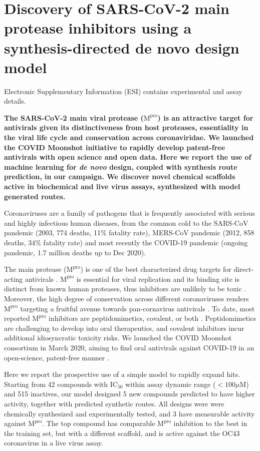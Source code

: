 \chapter{Discovery of SARS-CoV-2 main protease inhibitors using a synthesis-directed de novo design model}\label{ch:ranking}
Electronic Supplementary Information (ESI) contains experimental and assay details. 

\textbf{The SARS-CoV-2 main viral protease ($\mathrm{M}^\mathrm{pro}$) is an attractive target for antivirals given its distinctiveness from host proteases, essentiality in the viral life cycle and conservation across coronaviridae. We launched the COVID Moonshot initiative to rapidly develop patent-free antivirals with open science and open data. Here we report the use of machine learning for \emph{de novo} design, coupled with synthesis route prediction, in our campaign. We discover novel chemical scaffolds active in biochemical and live virus assays, synthesized with model generated routes. }

Coronaviruses are a family of pathogens that is frequently associated with serious and highly infectious human diseases, from the common cold to the SARS-CoV pandemic (2003, 774 deaths, 11\% fatality rate), MERS-CoV pandemic (2012, 858 deaths, 34\% fatality rate) and most recently the COVID-19 pandemic (ongoing pandemic, 1.7 million deaths up to Dec 2020).

The main protease ($\mathrm{M}^\mathrm{pro}$) is one of the best characterized drug targets for direct-acting antivirals \cite{pillaiyar2016overview,cannalire2020targeting}. $\mathrm{M}^\mathrm{pro}$ is essential for viral replication and its binding site is distinct from known human proteases, thus inhibitors are unlikely to be toxic \cite{jin2020structure,liu2020development}. Moreover, the high degree of conservation across different coronaviruses renders $\mathrm{M}^\mathrm{pro}$ targeting a fruitful avenue towards pan-cornavirus antivirals \cite{ullrich2020sars}. To date, most reported $\mathrm{M}^\mathrm{pro}$ inhibitors are peptidomimetics, covalent, or both \cite{cannalire2020targeting}. Peptidomimetics are challenging to develop into oral therapeutics, and covalent inhibitors incur additional idiosyncratic toxicity risks. We launched the COVID Moonshot consortium in March 2020, aiming to find oral antivirals against COVID-19 in an open-science, patent-free manner \cite{chodera2020crowdsourcing}. 

Here we report the prospective use of a simple model to rapidly expand hits. Starting from 42 compounds with $\mathrm{IC}_{50}$ within assay dynamic range ($<100 \mu$M) and 515 inactives, our model designed 5 new compounds predicted to have higher activity, together with predicted synthetic routes. All designs were were chemically synthesized and experimentally tested, and 3 have measurable activity against $\mathrm{M}^\mathrm{pro}$. The top compound has comparable $\mathrm{M}^\mathrm{pro}$ inhibition to the best in the training set, but with a different scaffold, and is active against the OC43 coronavirus in a live virus assay. 

